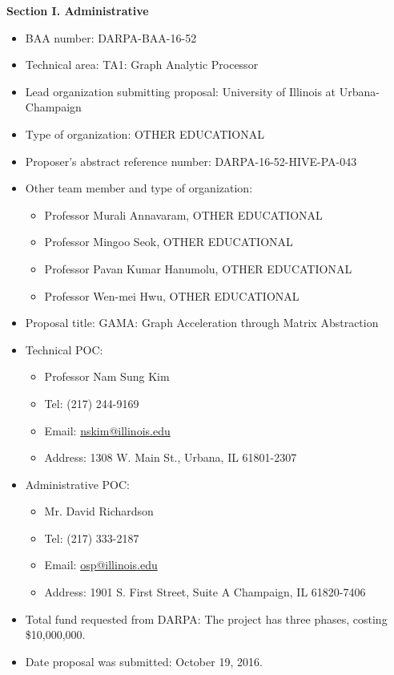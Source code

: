 \documentclass[12pt]{article}
\makeatletter
\renewcommand\section{\@startsection {section}{1}{\z@}%
   {-3ex \@plus -1ex \@minus -.2ex}%
   {1.7ex \@plus.2ex}%
   {\normalfont\large\bfseries}}
\makeatother
\begin{document}
\thispagestyle{empty}

\begin{comment}
\vspace{-0.2in}
\section{Statement of Work}

\newpage
\end{comment}

\noindent 
{\large \bfseries Section I. Administrative}

\begin{itemize}
\item BAA number: DARPA-BAA-16-52
\item Technical area: TA1: Graph Analytic Processor
\item Lead organization submitting proposal: University of Illinois at Urbana-Champaign
\item Type of organization: OTHER EDUCATIONAL
\item Proposer’s abstract reference number: DARPA-16-52-HIVE-PA-043
\item Other team member and type of organization: 
\begin{itemize}
\item Professor Murali Annavaram, OTHER EDUCATIONAL
\item Professor Mingoo Seok, OTHER EDUCATIONAL
\item Professor Pavan Kumar Hanumolu, OTHER EDUCATIONAL
\item Professor Wen-mei Hwu, OTHER EDUCATIONAL
\end{itemize}
\item Proposal title: GAMA: Graph Acceleration through Matrix Abstraction
\item Technical POC: 
\begin{itemize}
\item Professor Nam Sung Kim
\item Tel: (217) 244-9169
\item Email: \url{nskim@illinois.edu}
\item Address: 1308 W. Main St., Urbana, IL 61801-2307
\end{itemize}
\item Administrative POC: 
\begin{itemize}
\item Mr. David Richardson
\item Tel: (217) 333-2187
\item Email: \url{osp@illinois.edu}
\item Address: 1901 S. First Street, Suite A Champaign, IL 61820-7406
\end{itemize}
\item Total fund requested from DARPA: The project has three phases, costing \$10,000,000.
\item Date proposal was submitted: October 19, 2016.
\end{itemize}
\end{document}
